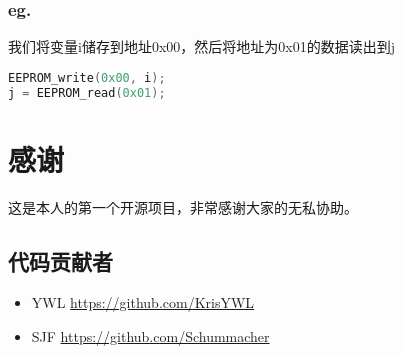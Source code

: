 \documentclass{report}
\begin{document}
        \subsection{eg.}
            我们将变量i储存到地址0x00，然后将地址为0x01的数据读出到j
            \begin{lstlisting}[language=C]
EEPROM_write(0x00, i);
j = EEPROM_read(0x01);
            \end{lstlisting}

\chapter{感谢}
    这是本人的第一个开源项目，非常感谢大家的无私协助。
    \section{代码贡献者}
        \begin{itemize}
            \item YWL	\url{https://github.com/KrisYWL}
            \item SJF	\url{https://github.com/Schummacher}
        \end{itemize}
\end{document}
